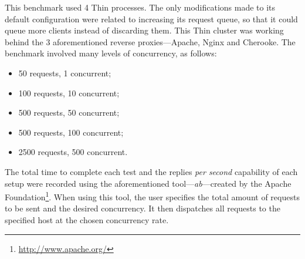 This benchmark used 4 Thin processes. The only modifications made to its default configuration were related to increasing its request queue, so that it could queue more clients instead of discarding them. This Thin cluster was working behind the 3 aforementioned reverse proxies---Apache, Nginx and Cherooke. The benchmark involved many levels of concurrency, as follows:
\begin{itemize}
  \item 50 requests, 1 concurrent;
  \item 100 requests, 10 concurrent;
  \item 500 requests, 50 concurrent;
  \item 500 requests, 100 concurrent;
  \item 2500 requests, 500 concurrent.
\end{itemize}
The total time to complete each test and the replies \textit{per second} capability of each setup were recorded using the aforementioned tool---\textit{ab}---created by the Apache Foundation\footnote{\url{http://www.apache.org/}}. When using this tool, the user specifies the total amount of requests to be sent and the desired concurrency. It then dispatches all requests to the specified host at the chosen concurrency rate.

